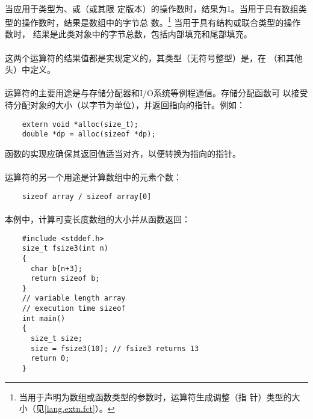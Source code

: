 {\paragraph{}
当应用于类型为、或（或其限
定版本）的操作数时，结果为1。当用于具有数组类型的操作数时，结果是数组中的字节总
数。\footnote{当用于声明为数组或函数类型的参数时，运算符生成调整（指
针）类型的大小（见\ref{lang.extn.fct}）。} 当用于具有结构或联合类型的操作数时，
结果是此类对象中的字节总数，包括内部填充和尾部填充。

\paragraph{}
这两个运算符的结果值都是实现定义的，其类型（无符号整型）是，在
（和其他头）中定义。

\paragraph{}
\ex {}运算符的主要用途是与存储分配器和I/O系统等例程通信。存储分配函数可
以接受待分配对象的大小（以字节为单位），并返回指向的指针。例如：
\begin{lstlisting}
    extern void *alloc(size_t);
    double *dp = alloc(sizeof *dp);
\end{lstlisting}
函数的实现应确保其返回值适当对齐，以便转换为指向的指针。

\paragraph{}
\ex {}运算符的另一个用途是计算数组中的元素个数：
\begin{lstlisting}
    sizeof array / sizeof array[0]
\end{lstlisting}

\paragraph{}
\ex 本例中，计算可变长度数组的大小并从函数返回：
\begin{lstlisting}
    #include <stddef.h>
    size_t fsize3(int n)
    {
      char b[n+3];
      return sizeof b;
    }
    // variable length array
    // execution time sizeof
    int main()
    {
      size_t size;
      size = fsize3(10); // fsize3 returns 13
      return 0;
    }
\end{lstlisting}

}
